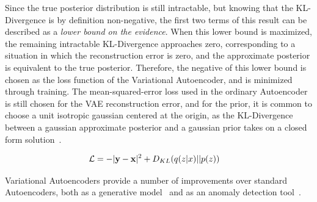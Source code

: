 \documentclass[12pt, a4paper]{article}
\begin{document}
Since the true posterior distribution is still intractable, but knowing that the KL-Divergence is by definition non-negative, the first two terms of this result can be described as a \textit{lower bound on the evidence}. When this lower bound is maximized, the remaining intractable KL-Divergence approaches zero, corresponding to a situation in which the reconstruction error is zero, and the approximate posterior is equivalent to the true posterior. Therefore, the negative of this lower bound is chosen as the loss function of the Variational Autoencoder, and is minimized through training. The mean-squared-error loss used in the ordinary Autoencoder is still chosen for the VAE reconstruction error, and for the prior, it is common to choose a unit isotropic gaussian centered at the origin, as the KL-Divergence between a gaussian approximate posterior and a gaussian prior takes on a closed form solution~\cite{Goodfellow-et-al-2016}.

\begin{align*}
\mathcal{L} &= - |{\textbf y} - {\textbf x}|^{2} + D_{KL}(q(z|x)||p(z))
\end{align*} 


Variational Autoencoders provide a number of improvements over standard Autoencoders, both as a generative model~\cite{kingma2014autoencoding} and as an anomaly detection tool~\cite{An2015VariationalAB}. 
\end{document}
